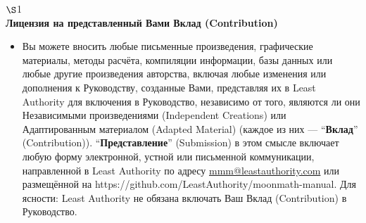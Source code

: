 \begin{center}
$\S$1\\\bfseries
Лицензия на представленный Вами Вклад (Contribution)
\end{center}

\begin{itemize}
\item[(1)] Вы можете вносить любые письменные произведения, графические материалы, методы расчёта, компиляции информации, базы данных или любые другие произведения авторства, включая любые изменения или дополнения к Руководству, созданные Вами, представляя их в Least Authority для включения в Руководство, независимо от того, являются ли они Независимыми произведениями (Independent Creations) или Адаптированным материалом (Adapted Material) (каждое из них --- ``\textbf{Вклад}'' (Contribution)). ``\textbf{Представление}'' (Submission) в этом смысле включает любую форму электронной, устной или письменной коммуникации, направленной в Least Authority по адресу \href{mailto:mmm@leastauthority.com}{mmm@leastauthority.com} или размещённой на https://github.com/LeastAuthority/moonmath-manual. Для ясности: Least Authority не обязана включать Ваш Вклад (Contribution) в Руководство.


\end{itemize}
